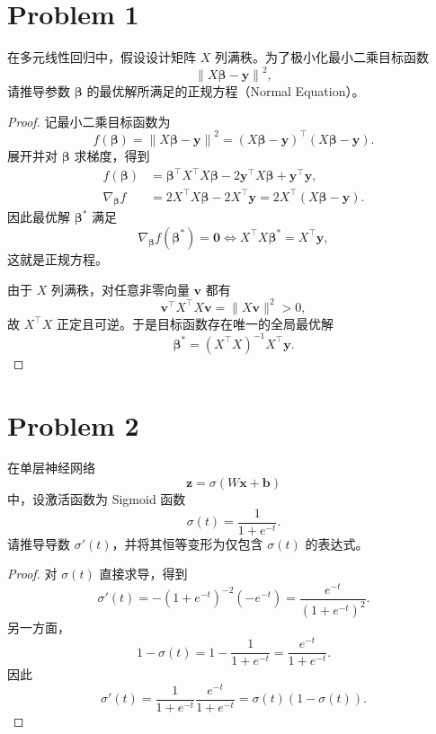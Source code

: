 \section*{Problem 1}

在多元线性回归中，假设设计矩阵 $X$ 列满秩。为了极小化最小二乘目标函数
\[
    \left\|X\bm{\beta} - \bm{y}\right\|^2,
\]
请推导参数 $\bm{\beta}$ 的最优解所满足的正规方程（Normal Equation）。

\begin{proof}
    记最小二乘目标函数为
    \[
        f(\bm{\beta})
        = \left\|X\bm{\beta} - \bm{y}\right\|^2
        = \left(X\bm{\beta} - \bm{y}\right)^\top
          \left(X\bm{\beta} - \bm{y}\right).
    \]
    展开并对 $\bm{\beta}$ 求梯度，得到
    \[
        \begin{aligned}
            f(\bm{\beta})
            &= \bm{\beta}^\top X^\top X\bm{\beta}
               - 2\bm{y}^\top X\bm{\beta}
               + \bm{y}^\top\bm{y}, \\
            \nabla_{\bm{\beta}} f
            &= 2X^\top X\bm{\beta} - 2X^\top\bm{y}
             = 2X^\top\left(X\bm{\beta} - \bm{y}\right).
        \end{aligned}
    \]
    因此最优解 $\bm{\beta}^*$ 满足
    \[
        \nabla_{\bm{\beta}}f(\bm{\beta}^*) = \bm{0}
        \iff
        \boxed{X^\top X\bm{\beta}^* = X^\top\bm{y}},
    \]
    这就是正规方程。

    由于 $X$ 列满秩，对任意非零向量 $\bm{v}$ 都有
    \[
        \bm{v}^\top X^\top X\bm{v} = \|X\bm{v}\|^2 > 0,
    \]
    故 $X^\top X$ 正定且可逆。于是目标函数存在唯一的全局最优解
    \[
        \boxed{\bm{\beta}^* = \left(X^\top X\right)^{-1}X^\top\bm{y}}.
    \]
\end{proof}

\section*{Problem 2}

在单层神经网络
\[
    \bm{z} = \sigma\left(W\bm{x} + \bm{b}\right)
\]
中，设激活函数为 Sigmoid 函数
\[
    \sigma(t) = \frac{1}{1 + e^{-t}}.
\]
请推导导数 $\sigma'(t)$，并将其恒等变形为仅包含 $\sigma(t)$ 的表达式。

\begin{proof}
    对 $\sigma(t)$ 直接求导，得到
    \[
        \sigma'(t)
        = -\left(1 + e^{-t}\right)^{-2}\left(-e^{-t}\right)
        = \frac{e^{-t}}{\left(1 + e^{-t}\right)^2}.
    \]
    另一方面，
    \[
        1 - \sigma(t)
        = 1 - \frac{1}{1 + e^{-t}}
        = \frac{e^{-t}}{1 + e^{-t}}.
    \]
    因此
    \[
        \boxed{\sigma'(t)
        = \frac{1}{1 + e^{-t}}\frac{e^{-t}}{1 + e^{-t}}
        = \sigma(t)\left(1 - \sigma(t)\right)}.
    \]
\end{proof}


